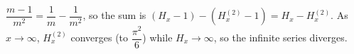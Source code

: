 $\dfrac{m-1}{m^2}=\dfrac1m-\dfrac1{m^2}$, so the sum is $(H_x-1)-(H^{(2)}_x-1)=\boxed{H_x-H^{(2)}_x}$. As $x\to\infty$, $H^{(2)}_x$ converges (to $\dfrac{\pi^2}6$) while $H_x\to\infty$, so the infinite series diverges.
